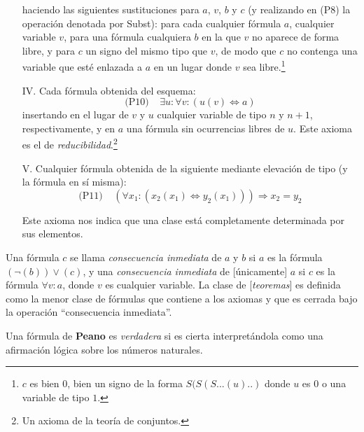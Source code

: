 \begin{sistemalogico}
\begin{itemize}
    haciendo las siguientes sustituciones para $a$, $v$, $b$ y $c$ (y realizando en (P8) la operación denotada por Subst): para cada cualquier fórmula $a$, cualquier variable $v$, para una fórmula cualquiera $b$ en la que $v$ no aparece de forma libre, y para $c$ un signo del mismo tipo que $v$, de modo que $c$ no contenga una variable que esté enlazada a $a$ en un lugar donde $v$ sea libre.\footnote{$c$ es bien $0$, bien un signo de la forma $S(S(S...(u)..)$ donde $u$ es $0$ o una variable de tipo $1$.}

    \item[IV.] Cada fórmula obtenida del esquema:
    $$
    \text{(P10)} \;\;\;\; \exists u : \forall v : (u(v) \iff a)
    $$
    insertando en el lugar de $v$ y $u$ cualquier variable de tipo $n$ y $n+1$, respectivamente, y en $a$ una fórmula sin ocurrencias libres de $u$. Este axioma es el de \emph{reducibilidad}.\footnote{Un axioma de la teoría de conjuntos.}

    \item[V.] Cualquier fórmula obtenida de la siguiente mediante elevación de tipo (y la fórmula en sí misma):
    $$
    \text{(P11)} \;\;\;\; \left(\forall x_1 : (x_2(x_1)\iff y_2(x_1))\right)\Rightarrow x_2=y_2
    $$

    Este axioma nos indica que una clase está completamente determinada por sus elementos.
\end{itemize}

Una fórmula $c$ se llama \emph{consecuencia inmediata} de $a$ y $b$ si $a$ es la fórmula $(\neg (b))\vee (c)$, y una \emph{consecuencia inmediata} de [únicamente] $a$ si $c$ es la fórmula $\forall v : a$, donde $v$ es cualquier variable. La clase de [\emph{teoremas}] es definida como la menor clase de fórmulas que contiene a los axiomas y que es cerrada bajo la operación ``consecuencia inmediata''.

Una fórmula de \textbf{Peano} es \emph{verdadera} si es cierta interpretándola como una afirmación lógica sobre los números naturales.
\end{sistemalogico}

